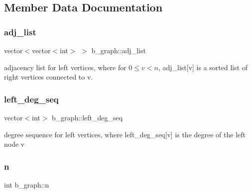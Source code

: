 \subsection{Member Data Documentation}
\mbox{\label{classb__graph_a2a89d2e8f958270952aab2e8769b7342}} 
\subsubsection{\texorpdfstring{adj\+\_\+list}{adj\_list}}
{\footnotesize\ttfamily vector$<$vector$<$int$>$ $>$ b\+\_\+graph\+::adj\+\_\+list\hspace{0.3cm}{\ttfamily [private]}}



adjacency list for left vertices, where for $0 \leq v < n $, adj\+\_\+list\mbox{[}v\mbox{]} is a sorted list of right vertices connected to v. 

\mbox{\label{classb__graph_a311d16462dbb10c47b3a6c80a42139d9}} 
\subsubsection{\texorpdfstring{left\+\_\+deg\+\_\+seq}{left\_deg\_seq}}
{\footnotesize\ttfamily vector$<$int$>$ b\+\_\+graph\+::left\+\_\+deg\+\_\+seq\hspace{0.3cm}{\ttfamily [private]}}



degree sequence for left vertices, where left\+\_\+deg\+\_\+seq\mbox{[}v\mbox{]} is the degree of the left node v 

\mbox{\label{classb__graph_a9e211d40c1799bc9b125de472ff06642}} 
\subsubsection{\texorpdfstring{n}{n}}
{\footnotesize\ttfamily int b\+\_\+graph\+::n\hspace{0.3cm}{\ttfamily [private]}}



